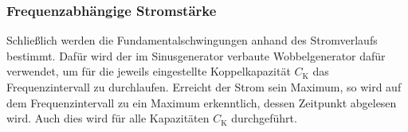 \subsubsection*{Frequenzabhängige Stromstärke}
 
Schließlich werden die Fundamentalschwingungen anhand des Stromverlaufs bestimmt. 
Dafür wird der im Sinusgenerator verbaute Wobbelgenerator dafür verwendet, um für die jeweils eingestellte
Koppelkapazität $C_{\text{K}}$ das Frequenzintervall zu durchlaufen. 
Erreicht der Strom sein Maximum, so wird auf dem Frequenzintervall zu ein Maximum erkenntlich, dessen Zeitpunkt abgelesen wird.
Auch dies wird für alle Kapazitäten $C_{\text{K}}$ durchgeführt.






